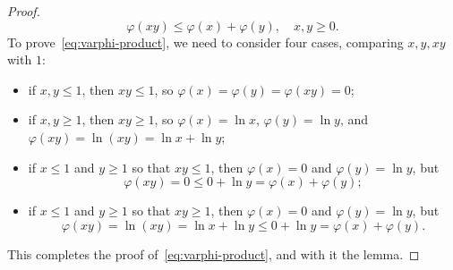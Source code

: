 \documentclass[10pt,a4paper]{amsart}
\begin{document}
\begin{proof}
\begin{equation}
\label{eq:varphi-product}
\varphi(xy) \le \varphi(x) + \varphi(y),\quad x, y \ge 0.
\end{equation}
To prove~\eqref{eq:varphi-product}, we need to consider four cases, comparing $x, y, xy$ with $1$: 
\begin{itemize}
\item if $x, y \le 1$, then $xy \le 1$, so $\varphi(x) = \varphi(y) = \varphi(xy) = 0$;
\item if $x, y \ge 1$, then $xy \ge 1$, so $\varphi(x) = \ln x$, $\varphi(y) = \ln y$, and $\varphi(xy) = \ln(xy) = \ln x + \ln y$;
\item if $x \le 1$ and $y \ge 1$ so that $xy \le 1$, then $\varphi(x) = 0$ and $\varphi(y) = \ln y$, but 
$$
\varphi(xy) = 0 \le 0 + \ln y = \varphi(x) + \varphi(y); 
$$
\item if $x \le 1$ and $y \ge 1$ so that $xy \ge 1$, then $\varphi(x) = 0$ and $\varphi(y) = \ln y$, but 
$$
\varphi(xy) = \ln(xy) = \ln x + \ln y \le 0 + \ln y = \varphi(x) + \varphi(y).
$$
\end{itemize}
This completes the proof of~\eqref{eq:varphi-product}, and with it the lemma.
\end{proof}
\end{document}
